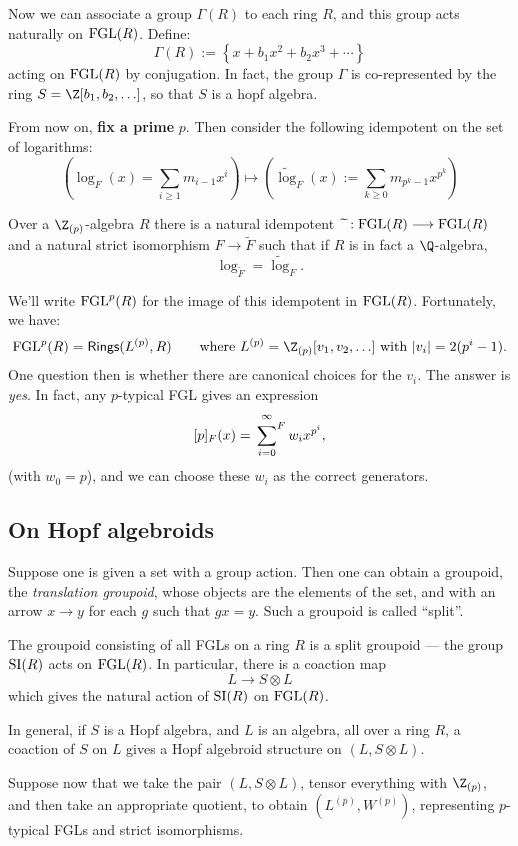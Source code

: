 \documentclass[11pt]{article}
\newcommand\Fsum{\sideset{}{^F}\sum}
\newcommand{\FGL}{\textup{FGL}}
\newcommand{\FGLp}{\textup{FGL}^{p}}
\newcommand{\SI}{\textup{SI}}
\begin{document}
\begin{Formal Group Laws}
\begin{shaded}
Now we can associate a group $\Gamma(R)$ to each ring $R$, and this group acts naturally on $\FGL(R)$. Define:
\[\Gamma(R):=\left\{x+b_1x^2+b_2x^3+\cdots\right\}\]
acting on $\FGL(R)$ by conjugation.
 In fact, the group $\Gamma$ is co-represented by the ring $S=\Z[b_1,b_2,\ldots]$, so that $S$ is a hopf algebra.

From now on, \textbf{fix a prime} $p$. Then consider the following idempotent on the set of logarithms:
\[\left(\log_F(x)=\sum_{i\geq1}m_{i-1}x^{i}\right) \mapsto
\left(\widetilde{\log}_F(x):= \sum_{k\geq0}m_{p^k-1}x^{p^k}\right)\]
\begin{thm*}
Over a $\Z_{(p)}$-algebra $R$ there is a natural idempotent\ $\widetilde{\,\,}:\FGL(R)\to\FGL(R)$ and a natural strict isomorphism $F\to\widetilde{F}$ such that if $R$ is in fact a $\Q$-algebra,
\[\log_{\widetilde{F}}=\widetilde{\log}_F.\]
\end{thm*}
We'll write $\FGLp(R)$ for the image of this idempotent in $\FGL(R)$. Fortunately, we have:
\[\FGLp(R)=\Rings(L^{(p)},R)\textup{\qquad where }L^{(p)}=\Z_{(p)}[v_1,v_2,\ldots]\textup{ with }|v_i|=2(p^i-1).\]
One question then is whether there are canonical choices for the $v_i$. The answer is \emph{yes}. In fact, any $p$-typical FGL gives an expression
\[[p]_F(x)=\Fsum_{i=0}^{\infty}w_ix^{p^i},\]
(with $w_0=p$), and we can choose these $w_i$ as the correct generators.
\subsection*{On Hopf algebroids}
Suppose one is given a set with a group action. Then one can obtain a groupoid, the \emph{translation groupoid}, whose objects are the elements of the set, and with an arrow $x\to y$ for each $g$ such that $gx=y$. Such a groupoid is called ``split''.

The groupoid consisting of all FGLs on a ring $R$ is a split groupoid --- the group $\SI(R)$ acts on $\FGL(R)$. In particular, there is a coaction map
\[L\to S\otimes L\]
which gives the natural action of $\SI(R)$ on $\FGL(R)$.

In general, if $S$ is a Hopf algebra, and $L$ is an algebra, all over a ring $R$, a coaction of $S$ on $L$ gives a Hopf algebroid structure on $(L,S\otimes L)$.

Suppose now that we take the pair $(L,S\otimes L)$, tensor everything with $\Z_{(p)}$, and then take an appropriate quotient, to obtain $(L^{(p)},W^{(p)})$, representing $p$-typical FGLs and strict isomorphisms.


\end{shaded}
\end{Formal Group Laws}
\end{document}
